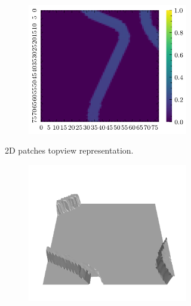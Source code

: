 \documentclass[../document.tex]{subfiles}
\begin{document}
\begin{figure} [htbp]
\begin{subfigure}[b]{1\textwidth}
\begin{subfigure}[b]{0.24\textwidth}
    \includegraphics[width=\linewidth]{../img/bars1-example-patches/2d/14.png}    
    \end{subfigure}  
\caption{2D patches topview representation.}
\end{subfigure}  
\begin{subfigure}[b]{1\textwidth}
    \begin{subfigure}[b]{0.24\textwidth}
    \includegraphics[width=\linewidth]{../img/bars1-example-patches/3d/2.png}    
    \end{subfigure}  

\end{subfigure}
\end{figure}
\end{document}
